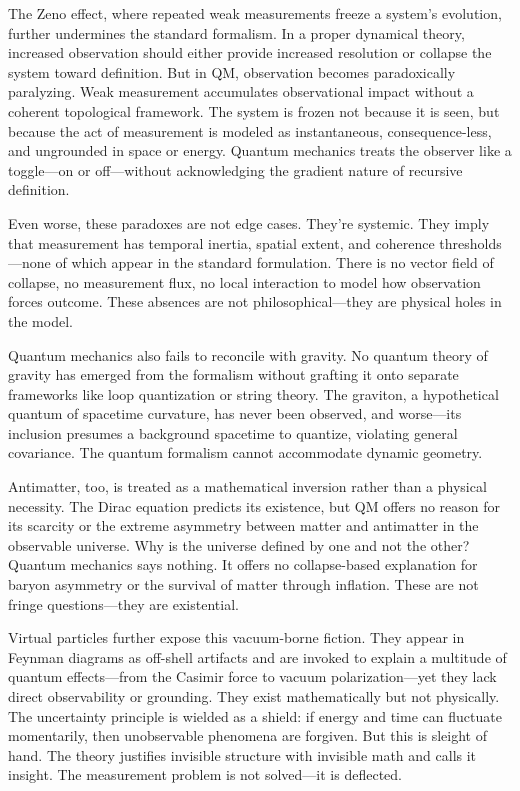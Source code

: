 The Zeno effect, where repeated weak measurements freeze a system’s evolution, further undermines the standard formalism. In a proper dynamical theory, increased observation should either provide increased resolution or collapse the system toward definition. But in QM, observation becomes paradoxically paralyzing. Weak measurement accumulates observational impact without a coherent topological framework. The system is frozen not because it is seen, but because the act of measurement is modeled as instantaneous, consequence-less, and ungrounded in space or energy. Quantum mechanics treats the observer like a toggle—on or off—without acknowledging the gradient nature of recursive definition.

Even worse, these paradoxes are not edge cases. They’re systemic. They imply that measurement has temporal inertia, spatial extent, and coherence thresholds—none of which appear in the standard formulation. There is no vector field of collapse, no measurement flux, no local interaction to model how observation forces outcome. These absences are not philosophical—they are physical holes in the model.

Quantum mechanics also fails to reconcile with gravity. No quantum theory of gravity has emerged from the formalism without grafting it onto separate frameworks like loop quantization or string theory. The graviton, a hypothetical quantum of spacetime curvature, has never been observed, and worse—its inclusion presumes a background spacetime to quantize, violating general covariance. The quantum formalism cannot accommodate dynamic geometry.

Antimatter, too, is treated as a mathematical inversion rather than a physical necessity. The Dirac equation predicts its existence, but QM offers no reason for its scarcity or the extreme asymmetry between matter and antimatter in the observable universe. Why is the universe defined by one and not the other? Quantum mechanics says nothing. It offers no collapse-based explanation for baryon asymmetry or the survival of matter through inflation. These are not fringe questions—they are existential.

Virtual particles further expose this vacuum-borne fiction. They appear in Feynman diagrams as off-shell artifacts and are invoked to explain a multitude of quantum effects—from the Casimir force to vacuum polarization—yet they lack direct observability or grounding. They exist mathematically but not physically. The uncertainty principle is wielded as a shield: if energy and time can fluctuate momentarily, then unobservable phenomena are forgiven. But this is sleight of hand. The theory justifies invisible structure with invisible math and calls it insight. The measurement problem is not solved—it is deflected.

